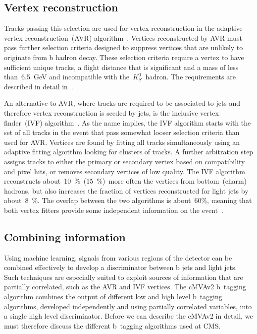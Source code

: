 \subsection{Vertex reconstruction}
Tracks passing this selection are used for vertex reconstruction in the adaptive vertex reconstruction~(AVR) algorithm~\cite{Waltenberger:2008zz}. Vertices reconstructed by AVR must pass further selection criteria designed to suppress vertices that are unlikely to originate from b hadron decay. These selection criteria require a vertex to have sufficient unique tracks, a flight distance that is significant and a mass of less than~6.5~GeV and incompatible with the~$K_S^0$~hadron. The requirements are described in detail in~\cite{CMS-PAS-BTV-15-001}.

An alternative to AVR, where tracks are required to be associated to jets and therefore vertex reconstruction is seeded by jets, is the inclusive vertex finder~(IVF) algorithm~\cite{Khachatryan:2011wq}. As the name implies, the IVF algorithm starts with the set of all tracks in the event that pass somewhat looser selection criteria than used for AVR. Vertices are found by fitting all tracks simultaneously using an adaptive fitting algorithm looking for clusters of tracks. A further arbitration step assigns tracks to either the primary or secondary vertex based on compatibility and pixel hits, or removes secondary vertices of low quality. The IVF algorithm reconstructs about~10~\%~(15~\%)~more often the vertices from bottom~(charm) hadrons, but also increases the fraction of vertices reconstructed for light jets by about~8~\%. The overlap between the two algorithms is about~60\%, meaning that both vertex fitters provide some independent information on the event~\cite{CMS-PAS-BTV-15-001}.

\subsection{Combining information}
Using machine learning, signals from various regions of the detector can be combined effectively to develop a discriminator between b jets and light jets. Such techniques are especially suited to exploit sources of information that are partially correlated, such as the AVR and IVF vertices. The cMVAv2 b~tagging algorithm combines the output of different low and high level b~tagging algorithms, developed independently and using partially correlated variables, into a single high level discriminator. Before we can describe the cMVAv2 in detail, we must therefore discuss the different b~tagging algorithms used at CMS.

